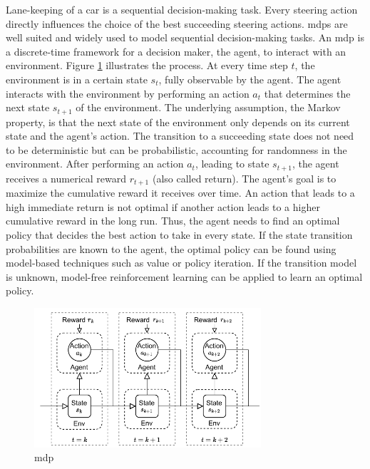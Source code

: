 Lane-keeping of a car is a sequential decision-making task. Every steering action directly influences the choice of the best succeeding steering actions. \Glspl{mdp} are well suited and widely used to model sequential decision-making tasks. An \gls{mdp} is a discrete-time framework for a decision maker, the agent, to interact with an environment. Figure \ref{fig:mdp} illustrates the process. At every time step $t$, the environment is in a certain state $s_t$, fully observable by the agent. The agent interacts with the environment by performing an action $a_t$ that determines the next state $s_{t+1}$ of the environment. The underlying assumption, the Markov property, is that the next state of the environment only depends on its current state and the agent's action. The transition to a succeeding state does not need to be deterministic but can be probabilistic, accounting for randomness in the environment. After performing an action $a_t$, leading to state $s_{t+1}$, the agent receives a numerical reward $r_{t+1}$ (also called return). The agent's goal is to maximize the cumulative reward it receives over time. An action that leads to a high immediate return is not optimal if another action leads to a higher cumulative reward in the long run. Thus, the agent needs to find an optimal policy that decides the best action to take in every state. If the state transition probabilities are known to the agent, the optimal policy can be found using model-based techniques such as value or policy iteration. If the transition model is unknown, model-free reinforcement learning can be applied to learn an optimal policy.

\begin{figure}[htbp]
    \centering
    \includegraphics[width=0.75\textwidth]{figures/MDP.pdf}
    \caption{\acrfull{mdp}}
    \label{fig:mdp}
\end{figure}

